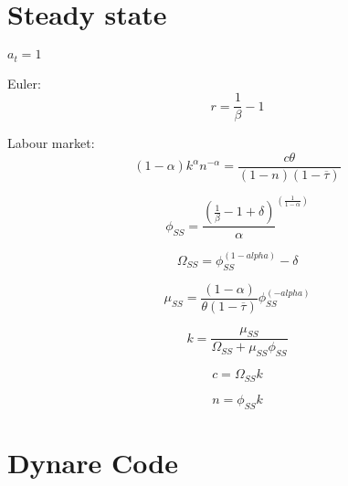 \documentclass[12pt]{extreport}
\begin{document}
\section{Steady state}
	$a_t = 1$

	Euler:
	\begin{equation}
	r = \frac{1}{\beta} - 1
	\end{equation}
	
	Labour market:
	\begin{equation}
	\left(1-\alpha \right)  k^{\alpha}  n^{-\alpha}  = \frac{c \theta}{(1-n)(1-\overline{\tau})}
	\end{equation}	
	
	\begin{equation}
	\phi_{SS} =  \frac{( \frac1{\beta}-1+\delta)}{\alpha}^{\left( \frac1{1-\alpha}\right)}
	\end{equation}		
	
	\begin{equation}
	\Omega_{SS} = 	\phi_{SS}^{(1-alpha)} - \delta
	\end{equation}	
	
	\begin{equation}
	\mu_{SS} = 	\frac{(1-\alpha)}{\theta (1-\overline{\tau})} \phi_{SS}^{(-alpha)}
	\end{equation}
	
	\begin{equation}
	k = \frac{\mu_{SS}}{\Omega_{SS} + \mu_{SS} \phi_{SS}}
	\end{equation}
	
	\begin{equation}
	c = \Omega_{SS}k
	\end{equation}
	
	\begin{equation}
	n =	\phi_{SS}  k
	\end{equation}

	

\section{Dynare Code}
\end{document}
